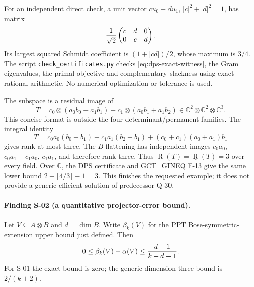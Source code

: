 For an independent direct check, a unit vector $cu_0+du_1$,
$|c|^2+|d|^2=1$, has matrix
\[
 {1\over\sqrt2}\begin{pmatrix}c&d&0\\0&c&d\end{pmatrix}.
\]
Its largest squared Schmidt coefficient is $(1+|cd|)/2$, whose
maximum is $3/4$. The script \texttt{check\_certificates.py} checks
\eqref{eq:dps-exact-witness}, the Gram eigenvalues, the primal
objective and complementary slackness using exact rational arithmetic.
No numerical optimization or tolerance is used.

The subspace is a residual image of
\[
 T=c_0\otimes(a_0b_0+a_1b_1)+c_1\otimes(a_0b_1+a_1b_2)
       \in\mathbb C^2\otimes\mathbb C^2\otimes\mathbb C^3.
\]
This concise format is outside the four determinant/permanent
families. The integral identity
\begin{equation}\label{eq:karatsuba}
 T=c_0a_0(b_0-b_1)+c_1a_1(b_2-b_1)
       +(c_0+c_1)(a_0+a_1)b_1
\end{equation}
gives rank at most three. The $B$-flattening has independent
images $c_0a_0$, $c_0a_1+c_1a_0$, $c_1a_1$, and therefore rank
three. Thus $\operatorname R(T)=\underline{\operatorname R}(T)=3$
over every field. Over $\mathbb C$, the DPS certificate and
GCT\_GINEQ F-13 give the same lower bound
$2+\lceil4/3\rceil-1=3$. This finishes the requested example;
it does not provide a generic efficient solution of predecessor Q-30.

\paragraph{Finding S-02 (a quantitative projector-error bound).}
Let $V\subseteq A\otimes B$ and $d=\dim B$. Write $\beta_k(V)$
for the PPT Bose-symmetric-extension upper bound just defined. Then
\begin{equation}\label{eq:dps-error}
 0\leq\beta_k(V)-\alpha(V)\leq {d-1\over k+d-1}.
\end{equation}
For S-01 the exact bound is zero; the generic dimension-three
bound is $2/(k+2)$.


